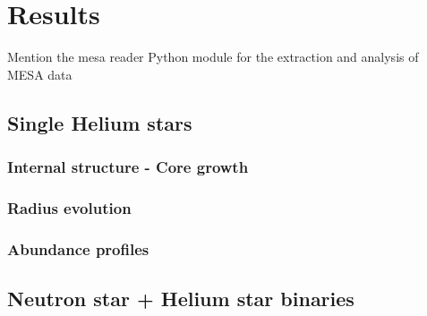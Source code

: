 \documentclass[../../main/thesis_msc.tex]{subfiles}
\begin{document}
	\chapter{Results}
	
		Mention the mesa reader Python module for the extraction and analysis of MESA data
		
			\section{Single Helium stars}
			
				\subsection{Internal structure - Core growth}
				
				
				\subsection{Radius evolution}
				
				
				\subsection{Abundance profiles}	
			
			
			
			\section{Neutron star + Helium star binaries}
\end{document}

